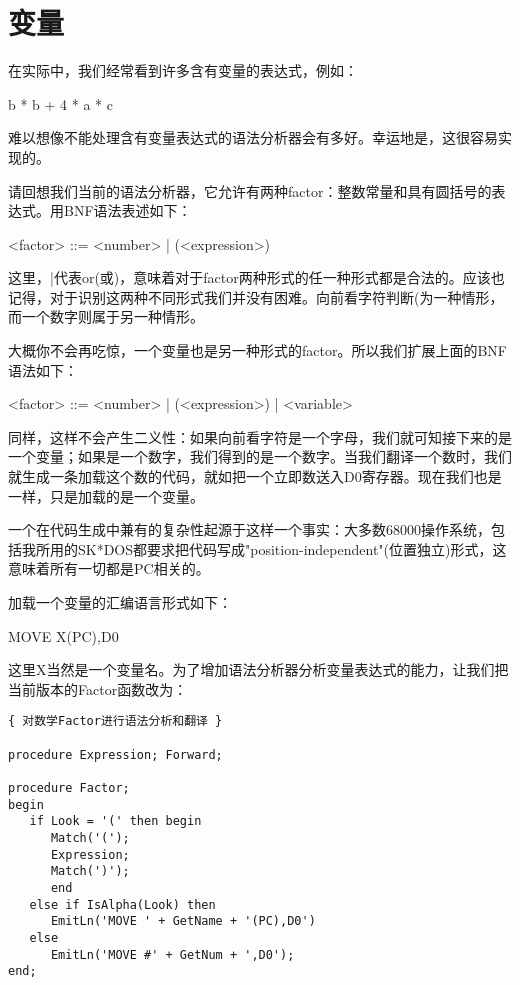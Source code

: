 \section{变量}

在实际中，我们经常看到许多含有变量的表达式，例如：

\begin{tcolorbox}
b * b + 4 * a * c
\end{tcolorbox}

难以想像不能处理含有变量表达式的语法分析器会有多好。幸运地是，这很容易实现的。

请回想我们当前的语法分析器，它允许有两种factor：整数常量和具有圆括号的表达式。用BNF语法表述如下：

\begin{tcolorbox}
<factor> ::= <number> | (<expression>)
\end{tcolorbox}

这里，|代表or(或)，意味着对于factor两种形式的任一种形式都是合法的。应该也记得，对于识别这两种不同形式我们并没有困难。向前看字符判断(为一种情形，而一个数字则属于另一种情形。

大概你不会再吃惊，一个变量也是另一种形式的factor。所以我们扩展上面的BNF语法如下：

\begin{tcolorbox}
<factor> ::= <number> | (<expression>) | <variable>
\end{tcolorbox}

同样，这样不会产生二义性：如果向前看字符是一个字母，我们就可知接下来的是一个变量；如果是一个数字，我们得到的是一个数字。当我们翻译一个数时，我们就生成一条加载这个数的代码，就如把一个立即数送入D0寄存器。现在我们也是一样，只是加载的是一个变量。

一个在代码生成中兼有的复杂性起源于这样一个事实：大多数68000操作系统，包括我所用的SK*DOS都要求把代码写成"position-independent"(位置独立)形式，这意味着所有一切都是PC相关的。

加载一个变量的汇编语言形式如下：

\begin{tcolorbox}
MOVE X(PC),D0
\end{tcolorbox}

这里X当然是一个变量名。为了增加语法分析器分析变量表达式的能力，让我们把当前版本的Factor函数改为：

\begin{verbatim}
{ 对数学Factor进行语法分析和翻译 }

procedure Expression; Forward;

procedure Factor;
begin
   if Look = '(' then begin
      Match('(');
      Expression;
      Match(')');
      end
   else if IsAlpha(Look) then
      EmitLn('MOVE ' + GetName + '(PC),D0')
   else
      EmitLn('MOVE #' + GetNum + ',D0');
end;
\end{verbatim}

